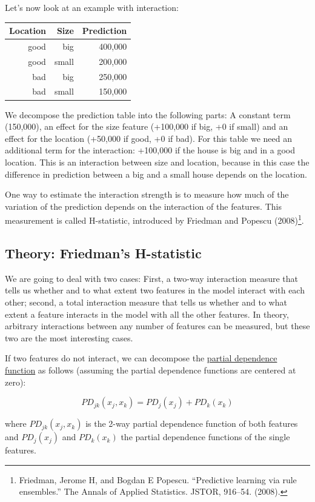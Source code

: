 \documentclass[
  11pt,
]{scrbook}
\begin{document}
Let's now look at an example with interaction:

\begin{longtable}[]{@{}rrr@{}}
\toprule
Location & Size & Prediction\tabularnewline
\midrule
\endhead
good & big & 400,000\tabularnewline
good & small & 200,000\tabularnewline
bad & big & 250,000\tabularnewline
bad & small & 150,000\tabularnewline
\bottomrule
\end{longtable}

We decompose the prediction table into the following parts:
A constant term (150,000), an effect for the size feature (+100,000 if big, +0 if small) and an effect for the location (+50,000 if good, +0 if bad).
For this table we need an additional term for the interaction: +100,000 if the house is big and in a good location.
This is an interaction between size and location, because in this case the difference in prediction between a big and a small house depends on the location.

One way to estimate the interaction strength is to measure how much of the variation of the prediction depends on the interaction of the features.
This measurement is called H-statistic, introduced by Friedman and Popescu (2008)\footnote{Friedman, Jerome H, and Bogdan E Popescu. ``Predictive learning via rule ensembles.'' The Annals of Applied Statistics. JSTOR, 916--54. (2008).}.

\hypertarget{theory-friedmans-h-statistic}{%
\subsection{Theory: Friedman's H-statistic}\label{theory-friedmans-h-statistic}}

We are going to deal with two cases:
First, a two-way interaction measure that tells us whether and to what extent two features in the model interact with each other;
second, a total interaction measure that tells us whether and to what extent a feature interacts in the model with all the other features.
In theory, arbitrary interactions between any number of features can be measured, but these two are the most interesting cases.

If two features do not interact, we can decompose the \protect\hyperlink{pdp}{partial dependence function} as follows (assuming the partial dependence functions are centered at zero):

\[PD_{jk}(x_j,x_k)=PD_j(x_j)+PD_k(x_k)\]

where \(PD_{jk}(x_j,x_k)\) is the 2-way partial dependence function of both features and \(PD_j(x_j)\) and \(PD_k(x_k)\) the partial dependence functions of the single features.
\end{document}
